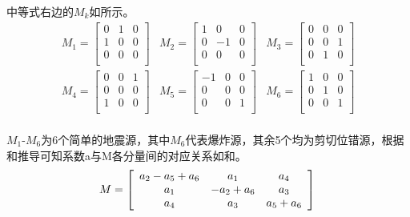 中等式右边的$M_k$如所示。
\begin{equation}
\label{eq2_03}
\begin{array}{ccc}
M_1=\left[\begin{array}{ccc}
0 & 1 & 0\\
1 & 0 & 0\\
0 & 0 & 0\\
\end{array}\right]&
M_2=\left[\begin{array}{ccc}
1 & 0 & 0\\
0 & -1 & 0\\
0 & 0 & 0\\
\end{array}\right]&
M_3=\left[\begin{array}{ccc}
0 & 0 & 0\\
0 & 0 & 1\\
0 & 1 & 0\\
\end{array}\right]\\
M_4=\left[\begin{array}{ccc}
0 & 0 & 1\\
0 & 0 & 0\\
1 & 0 & 0\\
\end{array}\right]&
M_5=\left[\begin{array}{ccc}
-1 & 0 & 0\\
0 & 0 & 0\\
0 & 0 & 1\\
\end{array}\right]&
M_6=\left[\begin{array}{ccc}
1 & 0 & 0\\
0 & 1 & 0\\
0 & 0 & 1\\
\end{array}\right]\\
\end{array}
\end{equation}

$M_1$-$M_6$为6个简单的地震源，其中$M_6$代表爆炸源，其余5个均为剪切位错源，根据和推导可知系数a与M各分量间的对应关系如和。
\begin{equation}
\label{eq2_04}
M=\left[\begin{array}{ccc}
a_2-a_5+a_6 & a_1 & a_4\\
a_1 & -a_2+a_6 & a_3\\
a_4 & a_3 & a_5+a_6\\
\end{array}\right]\\
\end{equation}

